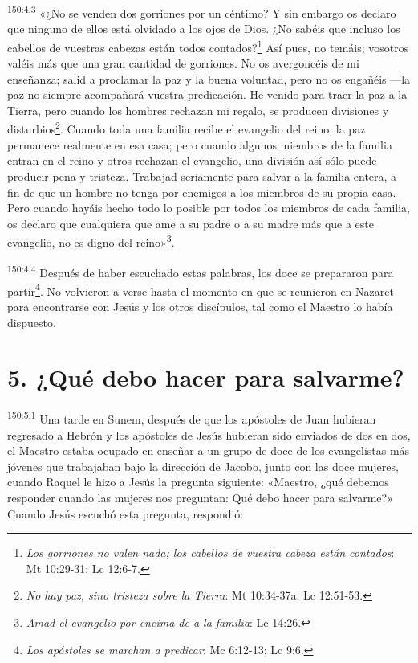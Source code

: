 \par 
\textsuperscript{150:4.3} «¿No se venden dos gorriones por un céntimo? Y sin embargo os declaro que ninguno de ellos está olvidado a los ojos de Dios. ¿No sabéis que incluso los cabellos de vuestras cabezas están todos contados?\footnote{\textit{Los gorriones no valen nada; los cabellos de vuestra cabeza están contados}: Mt 10:29-31; Lc 12:6-7.} Así pues, no temáis; vosotros valéis más que una gran cantidad de gorriones. No os avergoncéis de mi enseñanza; salid a proclamar la paz y la buena voluntad, pero no os engañéis ---la paz no siempre acompañará vuestra predicación. He venido para traer la paz a la Tierra, pero cuando los hombres rechazan mi regalo, se producen divisiones y disturbios\footnote{\textit{No hay paz, sino tristeza sobre la Tierra}: Mt 10:34-37a; Lc 12:51-53.}. Cuando toda una familia recibe el evangelio del reino, la paz permanece realmente en esa casa; pero cuando algunos miembros de la familia entran en el reino y otros rechazan el evangelio, una división así sólo puede producir pena y tristeza. Trabajad seriamente para salvar a la familia entera, a fin de que un hombre no tenga por enemigos a los miembros de su propia casa. Pero cuando hayáis hecho todo lo posible por todos los miembros de cada familia, os declaro que cualquiera que ame a su padre o a su madre más que a este evangelio, no es digno del reino»\footnote{\textit{Amad el evangelio por encima de a la familia}: Lc 14:26.}.

\par 
\textsuperscript{150:4.4} Después de haber escuchado estas palabras, los doce se prepararon para partir\footnote{\textit{Los apóstoles se marchan a predicar}: Mc 6:12-13; Lc 9:6.}. No volvieron a verse hasta el momento en que se reunieron en Nazaret para encontrarse con Jesús y los otros discípulos, tal como el Maestro lo había dispuesto.

\section*{5. ¿Qué debo hacer para salvarme?}
\par 
\textsuperscript{150:5.1} Una tarde en Sunem, después de que los apóstoles de Juan hubieran regresado a Hebrón y los apóstoles de Jesús hubieran sido enviados de dos en dos, el Maestro estaba ocupado en enseñar a un grupo de doce de los evangelistas más jóvenes que trabajaban bajo la dirección de Jacobo, junto con las doce mujeres, cuando Raquel le hizo a Jesús la pregunta siguiente: «Maestro, ¿qué debemos responder cuando las mujeres nos preguntan: Qué debo hacer para salvarme?» Cuando Jesús escuchó esta pregunta, respondió:

